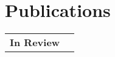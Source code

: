 \documentclass[letter,12pt]{article}
\begin{document}

\section{Publications}

\begin{tabularx}{\linewidth}{@{}l X@{}}
    \large \textbf{In Review} & \hfill {}\\
\end{tabularx}

\begin{refsection}
\nocite{*}
\printbibliography[heading=none]
\end{refsection}
\end{document}

